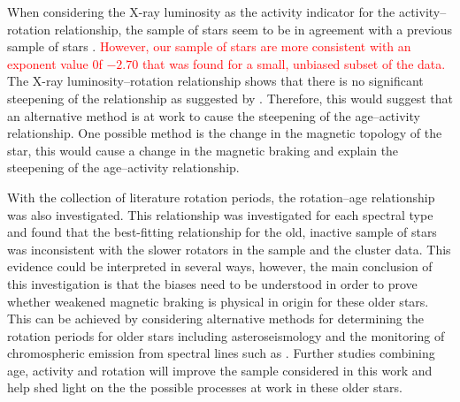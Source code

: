When considering the X-ray luminosity as the activity indicator for the activity--rotation relationship, the sample of stars seem to be in agreement with a previous sample of stars \citep{Wright_etal_2011}. \textcolor{red}{However, our sample of stars are more consistent with an exponent value 0f $-2.70$ that was found for a small, unbiased subset of the \citet{Wright_etal_2011} data.} The X-ray luminosity--rotation relationship shows that there is no significant steepening of the relationship as suggested by \citet{Booth_etal_2017}. Therefore, this would suggest that an alternative method is at work to cause the steepening of the age--activity relationship. One possible method is the change in the magnetic topology of the star, this would cause a change in the magnetic braking and explain the steepening of the age--activity relationship.

With the collection of literature rotation periods, the rotation--age relationship was also investigated. This relationship was investigated for each spectral type and found that the best-fitting relationship for the old, inactive sample of stars was inconsistent with the slower rotators in the sample and the cluster data. This evidence could be interpreted in several ways, however, the main conclusion of this investigation is that the biases need to be understood in order to prove whether weakened magnetic braking is physical in origin for these older stars. This can be achieved by considering alternative methods for determining the rotation periods for older stars including  asteroseismology and the monitoring of chromospheric emission from spectral lines such as \caII. Further studies combining age, activity and rotation will improve the sample considered in this work and help shed light on the the possible processes at work in these older stars.


